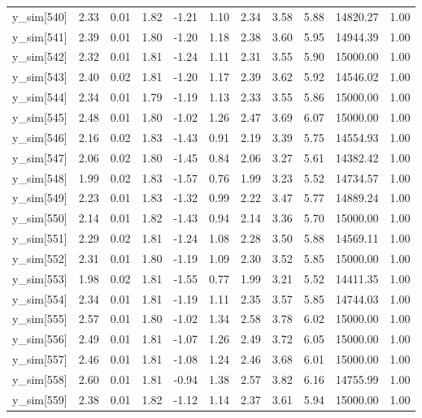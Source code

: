 \begin{table}[ht]
\begin{tabular}{rrrrrrrrrrr}
  y\_sim[540] & 2.33 & 0.01 & 1.82 & -1.21 & 1.10 & 2.34 & 3.58 & 5.88 & 14820.27 & 1.00 \\ 
  y\_sim[541] & 2.39 & 0.01 & 1.80 & -1.20 & 1.18 & 2.38 & 3.60 & 5.95 & 14944.39 & 1.00 \\ 
  y\_sim[542] & 2.32 & 0.01 & 1.81 & -1.24 & 1.11 & 2.31 & 3.55 & 5.90 & 15000.00 & 1.00 \\ 
  y\_sim[543] & 2.40 & 0.02 & 1.81 & -1.20 & 1.17 & 2.39 & 3.62 & 5.92 & 14546.02 & 1.00 \\ 
  y\_sim[544] & 2.34 & 0.01 & 1.79 & -1.19 & 1.13 & 2.33 & 3.55 & 5.86 & 15000.00 & 1.00 \\ 
  y\_sim[545] & 2.48 & 0.01 & 1.80 & -1.02 & 1.26 & 2.47 & 3.69 & 6.07 & 15000.00 & 1.00 \\ 
  y\_sim[546] & 2.16 & 0.02 & 1.83 & -1.43 & 0.91 & 2.19 & 3.39 & 5.75 & 14554.93 & 1.00 \\ 
  y\_sim[547] & 2.06 & 0.02 & 1.80 & -1.45 & 0.84 & 2.06 & 3.27 & 5.61 & 14382.42 & 1.00 \\ 
  y\_sim[548] & 1.99 & 0.02 & 1.83 & -1.57 & 0.76 & 1.99 & 3.23 & 5.52 & 14734.57 & 1.00 \\ 
  y\_sim[549] & 2.23 & 0.01 & 1.83 & -1.32 & 0.99 & 2.22 & 3.47 & 5.77 & 14889.24 & 1.00 \\ 
  y\_sim[550] & 2.14 & 0.01 & 1.82 & -1.43 & 0.94 & 2.14 & 3.36 & 5.70 & 15000.00 & 1.00 \\ 
  y\_sim[551] & 2.29 & 0.02 & 1.81 & -1.24 & 1.08 & 2.28 & 3.50 & 5.88 & 14569.11 & 1.00 \\ 
  y\_sim[552] & 2.31 & 0.01 & 1.80 & -1.19 & 1.09 & 2.30 & 3.52 & 5.85 & 15000.00 & 1.00 \\ 
  y\_sim[553] & 1.98 & 0.02 & 1.81 & -1.55 & 0.77 & 1.99 & 3.21 & 5.52 & 14411.35 & 1.00 \\ 
  y\_sim[554] & 2.34 & 0.01 & 1.81 & -1.19 & 1.11 & 2.35 & 3.57 & 5.85 & 14744.03 & 1.00 \\ 
  y\_sim[555] & 2.57 & 0.01 & 1.80 & -1.02 & 1.34 & 2.58 & 3.78 & 6.02 & 15000.00 & 1.00 \\ 
  y\_sim[556] & 2.49 & 0.01 & 1.81 & -1.07 & 1.26 & 2.49 & 3.72 & 6.05 & 15000.00 & 1.00 \\ 
  y\_sim[557] & 2.46 & 0.01 & 1.81 & -1.08 & 1.24 & 2.46 & 3.68 & 6.01 & 15000.00 & 1.00 \\ 
  y\_sim[558] & 2.60 & 0.01 & 1.81 & -0.94 & 1.38 & 2.57 & 3.82 & 6.16 & 14755.99 & 1.00 \\ 
  y\_sim[559] & 2.38 & 0.01 & 1.82 & -1.12 & 1.14 & 2.37 & 3.61 & 5.94 & 15000.00 & 1.00 \\ 

\end{tabular}
\end{table}

